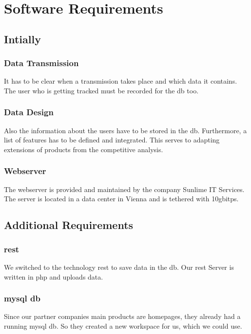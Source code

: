 \chapter{Software Requirements}
\section{Intially}
\subsection{Data Transmission}
It has to be clear when a transmission takes place and which data it contains. The user who is getting tracked must be recorded for the \gls{db} too.
\subsection{Data Design}
Also the information about the users have to be stored in the \gls{db}. Furthermore, a list of features has to be defined and integrated. This serves to adapting extensions of products from the competitive analysis.
\subsection{Webserver}
The webserver is provided and maintained by the company Sunlime IT Services. The server is located in a data center in Vienna and is tethered with 10\gls{gbitps}.
\section{Additional Requirements}
\subsection{\gls{rest}}
We switched to the technology \gls{rest} to save data in the \gls{db}. Our \gls{rest} Server is written in \gls{php} and uploads data.
\subsection{\gls{mysql} \gls{db}}
Since our partner companies main products are homepages, they already had a running \gls{mysql} \gls{db}. So they created a new workspace for us, which we could use.